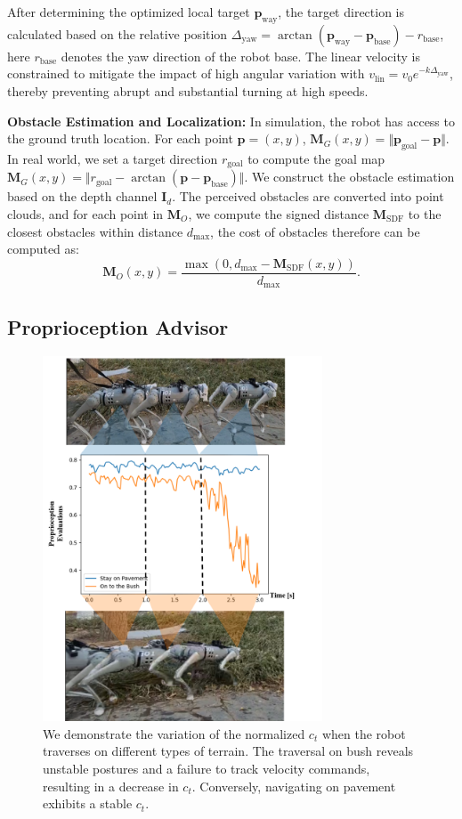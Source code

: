 \documentclass[conference]{IEEEtran}
\begin{document}
After determining the optimized local target $\bm{p}_\textrm{way}$, the target direction is calculated based on the relative position $\Delta_\textrm{yaw}=\arctan(\bm{p}_\textrm{way}-\bm{p}_\textrm{base})-r_\textrm{base}$, {here $r_\textrm{base}$ denotes the yaw direction of the robot base.} The linear velocity is constrained to mitigate the impact of high angular variation with $v_\textrm{lin}=v_0e^{-k \Delta_{\textrm{yaw}}}$, thereby preventing abrupt and substantial turning at high speeds.

\setParDis
\noindent\textbf{Obstacle Estimation and Localization:}
In simulation, the robot has access to the ground truth location. For each point $\bm{p}=(x,y)$, $\bm{M}_G(x,y)=\Vert \bm{p}_\textrm{goal}-\bm{p} \Vert$. In real world, we set a target direction $r_\textrm{goal}$ to compute the goal map $\bm{M}_G(x,y) =\Vert r_\textrm{goal}-\arctan(\bm{p}-\bm{p}_\textrm{base})\Vert$. We construct the obstacle estimation based on the depth channel $\bm{I}_d$. The perceived obstacles are converted into point clouds, and for each point in $\bm{M}_O$, we compute the signed distance $\bm{M}_\textrm{SDF}$ to the closest obstacles within distance $d_\textrm{max}$, the cost of obstacles therefore can be computed as:
\begin{equation}
    \bm{M}_O(x,y)=\frac{\max(0,d_\textrm{max}-\bm{M}_\textrm{SDF}(x,y))}{d_\textrm{max}}.
\end{equation}

\subsection{Proprioception Advisor}

\begin{figure}[htbp]
\centerline{\includegraphics[width=8.3cm]{figures/Critic.pdf}}
\caption{We demonstrate the variation of the normalized ${c_t}$ when the robot traverses on different types of terrain. The traversal on bush reveals unstable postures and a failure to track velocity commands, resulting in a decrease in $c_t$. Conversely, navigating on pavement exhibits a stable $c_t$.}
\label{critic}
\end{figure}
\end{document}
